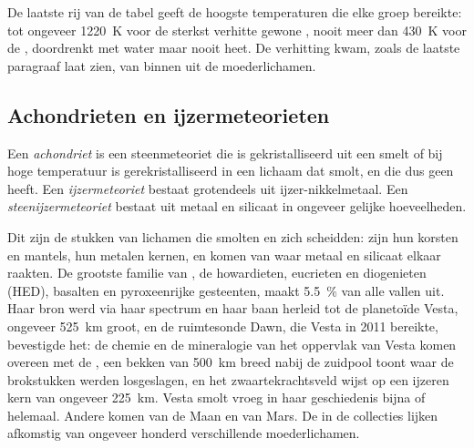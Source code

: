 De laatste rij van de tabel geeft de hoogste temperaturen die elke groep bereikte:
tot ongeveer \qty{1220}{K} voor de sterkst verhitte gewone , nooit meer
dan \qty{430}{K} voor de , doordrenkt met water maar nooit heet. De
verhitting kwam, zoals de laatste paragraaf laat zien, van binnen uit de moederlichamen.

\subsection{Achondrieten en ijzermeteorieten}

\begin{definition}
\label{def:b2:planet-formation-meteorites:classes}
Een \emph{achondriet} is een steenmeteoriet die is gekristalliseerd
uit een smelt of bij hoge temperatuur is gerekristalliseerd in een lichaam dat smolt, en
die dus geen  heeft. Een \emph{ijzermeteoriet} bestaat
grotendeels uit ijzer-nikkelmetaal. Een
\emph{steenijzermeteoriet} bestaat uit metaal en silicaat in ongeveer
gelijke hoeveelheden.
\end{definition}

Dit zijn de stukken van lichamen die smolten en zich scheidden:  zijn hun
korsten en mantels,  hun metalen kernen, en  komen van waar
metaal en silicaat elkaar raakten. De grootste familie van , de howardieten,
eucrieten en diogenieten (HED), basalten en pyroxeenrijke gesteenten, maakt
\qty{5.5}{\percent} van alle vallen uit. Haar bron werd via haar spectrum en
haar baan herleid tot de planetoïde Vesta, ongeveer \qty{525}{km} groot, en de
ruimtesonde Dawn, die Vesta in 2011 bereikte, bevestigde het: de chemie
en de mineralogie van het oppervlak van Vesta komen overeen met de , een bekken
van \qty{500}{km} breed nabij de zuidpool toont waar de brokstukken werden
losgeslagen, en het zwaartekrachtsveld wijst op een ijzeren kern van ongeveer \qty{225}{km}.
Vesta smolt vroeg in haar geschiedenis bijna of helemaal. Andere  komen
van de Maan en van Mars. De  in de collecties lijken afkomstig
van ongeveer honderd verschillende moederlichamen.

